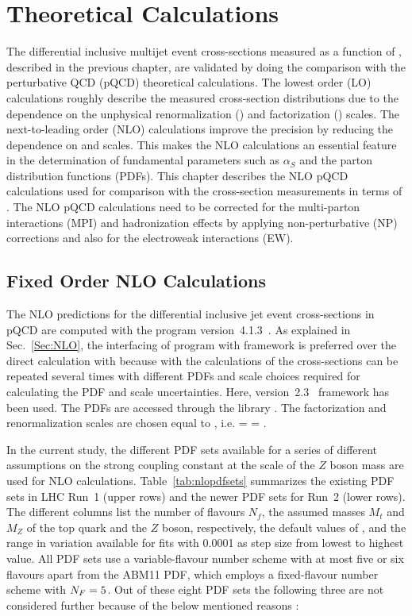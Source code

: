 \chapter{Theoretical Calculations}
\label{chap:Theory_Predictions}

The differential inclusive multijet event cross-sections measured as a function of \httwo, described in the previous chapter, are validated by doing the comparison with the perturbative QCD (pQCD) theoretical calculations. The lowest order (LO) calculations roughly describe the measured cross-section distributions due to the dependence on the unphysical renormalization (\mur) and factorization (\muf) scales. The next-to-leading order (NLO) calculations improve the precision by reducing the dependence on \mur and \muf scales. This makes the NLO calculations an essential feature in the determination of fundamental parameters such as $\alpha_S$ and the parton distribution functions (PDFs). This chapter describes the NLO pQCD calculations used for comparison with the cross-section measurements in terms of \httwo. The NLO pQCD calculations need to be corrected for the multi-parton interactions (MPI) and hadronization effects by applying non-perturbative (NP) corrections and also for the electroweak interactions (EW).

\section{Fixed Order NLO Calculations}
The NLO predictions for the differential inclusive jet event cross-sections in pQCD are computed with the \NLOJETPP program version~4.1.3~\cite{Nagy:2001fj,Nagy:2003tz}. As explained in Sec.~\ref{Sec:NLO}, the interfacing of \NLOJETPP program with \fastNLO \cite{Kluge:2006xs,Britzger:2012bs} framework is preferred over the direct calculation with \NLOJETPP because with \fastNLO the calculations of the cross-sections can be repeated several times with different PDFs and scale choices required for calculating the PDF and scale uncertainties. Here, \fastNLO version~2.3~ framework has been used. The PDFs are accessed through the \LHAPDFS library \cite{Whalley:2005nh,Buckley:2014ana}. The factorization and renormalization scales are chosen equal to \httwo, i.e. \muf = \mur = \httwo. 

In the current study, the different PDF sets available for a series of different assumptions on the strong coupling constant at the scale of the $Z$ boson mass \alpsmz are used for NLO calculations. Table~\ref{tab:nlopdfsets} summarizes the existing PDF sets in LHC Run~1 (upper rows) and the newer PDF sets for Run~2 (lower rows). The different columns list the number of flavours $N_f$, the assumed masses $M_t$ and $M_Z$ of the top quark and the $Z$ boson, respectively, the default values of \alpsmz, and the range in \alpsmz variation available for fits with 0.0001 as step size from lowest to highest value. All PDF sets use a variable-flavour number scheme with at most five or six flavours apart from the ABM11 PDF, which employs a fixed-flavour number scheme with $N_F=5$. Out of these eight PDF sets the following three are not considered further because of the below mentioned reasons :

